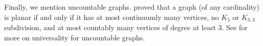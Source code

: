 \documentclass[a4paper,11pt]{article}
\theoremstyle{plain}
\theoremstyle{definition}
\begin{document}

Finally, we mention uncountable graphs. \citet{Wagner67} proved that a graph (of any cardinality) is planar if and only if it has at most continuumly many vertices, no $K_5$ or $K_{3,3}$ subdivision, and at most countably many vertices of degree at least 3. See \citep{Kojman98,KP84} for more on universality for uncountable graphs. 






\end{document}
